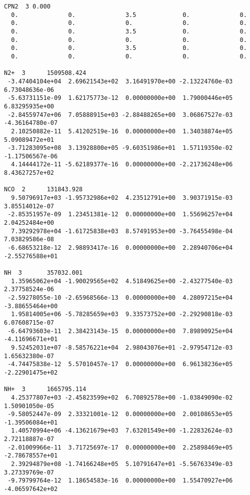 \begin{verbatim}
CPN2  3	0.000            						 
  0.              0.              3.5             0.              0.            
  0.              0.              0.              0.              0.            
  0.              0.              3.5             0.              0.            
  0.              0.              0.              0.              0.            
  0.              0.              3.5             0.              0.            
  0.              0.              0.              0.              0.            
										 
N2+  3		1509508.424						         
 -3.47404104e+04  2.69621543e+02  3.16491970e+00 -2.13224760e-03  6.73048636e-06
 -5.63731151e-09  1.62175773e-12  0.00000000e+00  1.79000446e+05  6.83295935e+00
 -2.84559747e+06  7.05888915e+03 -2.88488265e+00  3.06867527e-03 -4.36164780e-07
  2.10250882e-11  5.41202519e-16  0.00000000e+00  1.34038874e+05  5.09089472e+01
 -3.71283095e+08  3.13928800e+05 -9.60351986e+01  1.57119350e-02 -1.17506567e-06
  4.14444172e-11 -5.62189377e-16  0.00000000e+00 -2.21736248e+06  8.43627257e+02
										 
NCO  2		131843.928						         
  9.50796917e+03 -1.95732986e+02  4.23512791e+00  3.90371915e-03  3.85514012e-07
 -2.85351957e-09  1.23451381e-12  0.00000000e+00  1.55696257e+04  2.04252484e+00
  7.39292978e+04 -1.61725838e+03  8.57491953e+00 -3.76455498e-04  7.03829586e-08
 -6.68653218e-12  2.98893417e-16  0.00000000e+00  2.28940706e+04 -2.55276588e+01
										 
NH  3		357032.001							 
  1.35965062e+04 -1.90029565e+02  4.51849625e+00 -2.43277540e-03  2.37758524e-06
 -2.59278055e-10 -2.65968566e-13  0.00000000e+00  4.28097215e+04 -3.88655464e+00
  1.95814005e+06 -5.78285659e+03  9.33573752e+00 -2.29290818e-03  6.07608715e-07
 -6.64793603e-11  2.38423143e-15  0.00000000e+00  7.89890925e+04 -4.11696671e+01
  9.52452031e+07 -8.58576221e+04  2.98043076e+01 -2.97954712e-03  1.65632380e-07
 -4.74475838e-12  5.57010457e-17  0.00000000e+00  6.96138236e+05 -2.22901475e+02
										 
NH+  3		1665795.114						         
  4.25377807e+03 -2.45823599e+02  6.70892578e+00 -1.03849090e-02  1.50901050e-05
 -9.58052447e-09  2.33321001e-12  0.00000000e+00  2.00108653e+05 -1.39506084e+01
  1.40570994e+06 -4.13621679e+03  7.63201549e+00 -1.22832624e-03  2.72118887e-07
 -2.01009966e-11  3.71725697e-17  0.00000000e+00  2.25898469e+05 -2.78678557e+01
  2.39294879e+08 -1.74166248e+05  5.10791647e+01 -5.56763349e-03  3.27339769e-07
 -9.79799764e-12  1.18654583e-16  0.00000000e+00  1.55470927e+06 -4.06597642e+02
										 

\end{verbatim}
